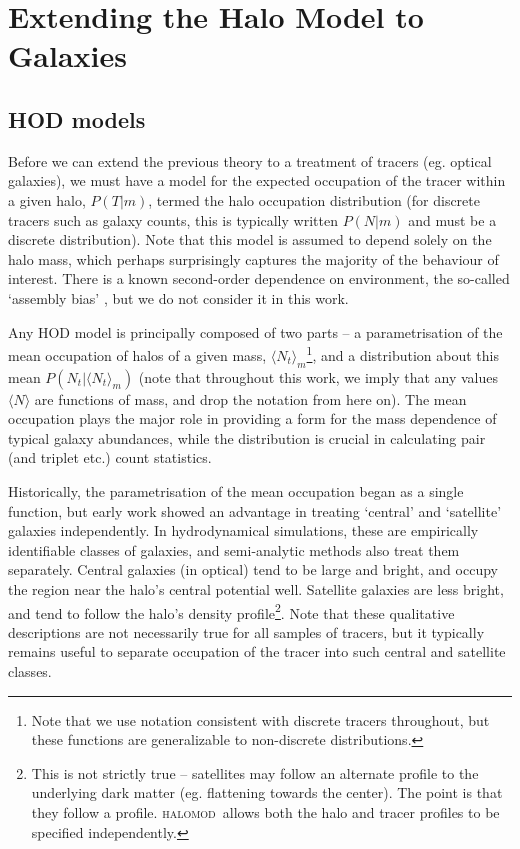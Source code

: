 \documentclass[5p]{elsarticle}
\newcommand{\Nt}{\langle N_t \rangle}
\newcommand{\halomod}{\textsc{halomod}}
\begin{document}
\section{Extending the Halo Model to Galaxies}
\label{sec:TracerHaloModel}

\subsection{HOD models}
\label{sec:theory-gal:hod}
Before we can extend the previous theory to a treatment of tracers (eg. optical galaxies), we must have a model for the expected occupation of the tracer within a given halo, $P(T|m)$, termed the halo occupation distribution (for discrete tracers such as galaxy counts, this is typically written $P(N|m)$ and must be a discrete distribution). Note that this model is assumed to depend solely on the halo mass, which perhaps surprisingly captures the majority of the behaviour of interest. There is a known second-order dependence on environment, the so-called `assembly bias' \citep{Sunayama2015}, but we do not consider it in this work.

Any HOD model is principally composed of two parts -- a parametrisation of the mean occupation of halos of a given mass, $\Nt_m$\footnote{Note that we use notation consistent with discrete tracers throughout, but these functions are generalizable to non-discrete distributions.}, and a distribution about this mean $P(N_t|\Nt_m)$ (note that throughout this work, we imply that any values $\langle N \rangle$ are functions of mass, and drop the notation from here on). The mean occupation plays the major role in providing a form for the mass dependence of typical galaxy abundances, while the distribution is crucial in calculating pair (and triplet etc.) count statistics. 

Historically, the parametrisation of the mean occupation began as a single function, but early work \citep{Kauffmann2004,Zheng2005,Zehavi2005} showed an advantage in treating `central' and `satellite' galaxies independently. In hydrodynamical simulations, these are empirically identifiable classes of galaxies, and semi-analytic methods also treat them separately. Central galaxies (in optical) tend to be large and bright, and occupy the region near the halo's central potential well. Satellite galaxies are less bright, and tend to follow the halo's density profile\footnote{This is not strictly true -- satellites may follow an alternate profile to the underlying dark matter (eg. flattening towards the center). The point is that they follow a profile. \halomod\ allows both the halo and tracer profiles to be specified independently.}.  Note that these qualitative descriptions are not necessarily true for all samples of tracers, but it typically remains useful to separate occupation of the tracer into such central and satellite classes.
\end{document}
